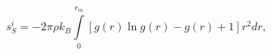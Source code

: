 \documentclass[12pt]{article}
\begin{document}
\thispagestyle{empty}

$$
   s_S^i=-2\pi\rho k_B \int\limits_0^{r_m} \left [ g(r) \ln g(r) - g(r) + 1 \right ] r^2 dr ,
$$
\end{document}
